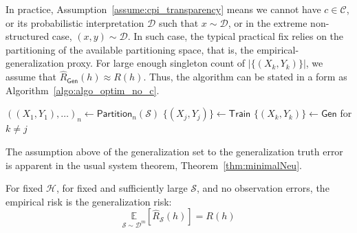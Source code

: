 \documentclass[
  journal=largetwo,
  year=2025,
  volume=37,
]{cup-journal}
\begin{document}
In practice, Assumption~\ref{assume:cpi_transparency} means we cannot have $c\in\mathcal{C}$, or its probabilistic interpretation $\mathcal{D}$ such that $x\sim\mathcal{D}$, or in the extreme non-structured case, $(x,y)\sim \mathcal{D}$. In such case, the typical practical fix relies on the partitioning of the available partitioning space, that is, the empirical-generalization proxy. For large enough singleton count of $|\{(X_{k},Y_{k})\}|$, we assume that $\hat{R}_{\mathsf{Gen}}(h)\approx R(h)$. Thus, the algorithm can be stated in a form as Algorithm~\ref{algo:algo_optim_no_c}.

\begin{algorithm}[htb]
    \renewcommand{\algorithmcfname}{Optimization problem}
    \caption{Empirical-generalization learning dynamics (proxy)}
    \Begin
    {
        $((X_{1},Y_{1}),\dots)_{n}\gets\mathsf{Partition}_{n}(\mathcal{S})$\;
        $\{(X_{j},Y_{j})\}\gets \mathsf{Train}$\;
        $\{(X_{k},Y_{k})\}\gets \mathsf{Gen}$ for $k\ne j$\;
    }
    \label{algo:algo_optim_no_c}
\end{algorithm}
The assumption above of the generalization set to the generalization truth error is apparent in the usual system theorem, Theorem~\ref{thm:minimalNeu}.
\begin{theorem}[\cite{10.5555/2371238}]\label{thm:minimalNeu}
    For fixed $\mathcal{H}$, for fixed and sufficiently large $\mathcal{S}$, and no observation errors, the empirical risk is the generalization risk: \begin{equation}
        \underset{\mathcal{S}\sim \mathcal{D}^{m}}{\mathbb{E}}[\hat{R}_{\mathcal{S}}(h)]  = R(h)
    \end{equation} 
\end{theorem}
\end{document}
